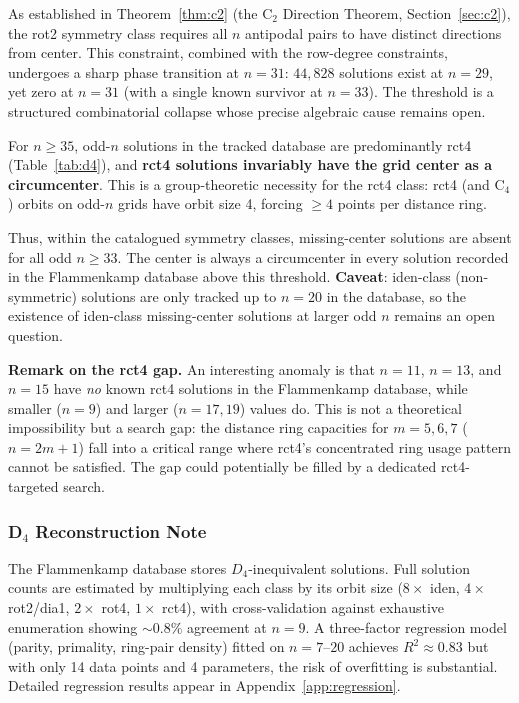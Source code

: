 \documentclass[11pt,a4paper]{article}
\theoremstyle{plain}
\theoremstyle{definition}
\begin{document}
As established in Theorem~\ref{thm:c2} (the C$_2$ Direction Theorem, Section~\ref{sec:c2}), the rot2 symmetry class requires all $n$ antipodal pairs to have distinct directions from center. This constraint, combined with the row-degree constraints, undergoes a sharp phase transition at $n=31$: $44{,}828$ solutions exist at $n=29$, yet zero at $n=31$ (with a single known survivor at $n=33$). The threshold is a structured combinatorial collapse whose precise algebraic cause remains open.

For $n\ge 35$, odd-$n$ solutions in the tracked database are predominantly rct4 (Table~\ref{tab:d4}), and \textbf{rct4 solutions invariably have the grid center as a circumcenter}. This is a group-theoretic necessity for the rct4 class: rct4 (and C$_4$) orbits on odd-$n$ grids have orbit size 4, forcing $\ge 4$ points per distance ring.

Thus, within the catalogued symmetry classes, missing-center solutions are absent for all odd $n\ge 33$. The center is always a circumcenter in every solution recorded in the Flammenkamp database above this threshold. \textbf{Caveat}: iden-class (non-symmetric) solutions are only tracked up to $n=20$ in the database, so the existence of iden-class missing-center solutions at larger odd $n$ remains an open question.

\noindent\textbf{Remark on the rct4 gap.} An interesting anomaly is that $n=11$, $n=13$, and $n=15$ have \emph{no} known rct4 solutions in the Flammenkamp database, while smaller ($n=9$) and larger ($n=17,19$) values do. This is not a theoretical impossibility but a search gap: the distance ring capacities for $m=5,6,7$ ($n=2m+1$) fall into a critical range where rct4's concentrated ring usage pattern cannot be satisfied. The gap could potentially be filled by a dedicated rct4-targeted search.

\subsubsection{D$_4$ Reconstruction Note}

The Flammenkamp database stores $D_4$-inequivalent solutions. Full solution counts are estimated by multiplying each class by its orbit size ($8\times$ iden, $4\times$ rot2/dia1, $2\times$ rot4, $1\times$ rct4), with cross-validation against exhaustive enumeration showing $\sim0.8\%$ agreement at $n=9$. A three-factor regression model (parity, primality, ring-pair density) fitted on $n=7$--$20$ achieves $R^2\approx0.83$ but with only 14 data points and 4 parameters, the risk of overfitting is substantial. Detailed regression results appear in Appendix~\ref{app:regression}.
\end{document}
